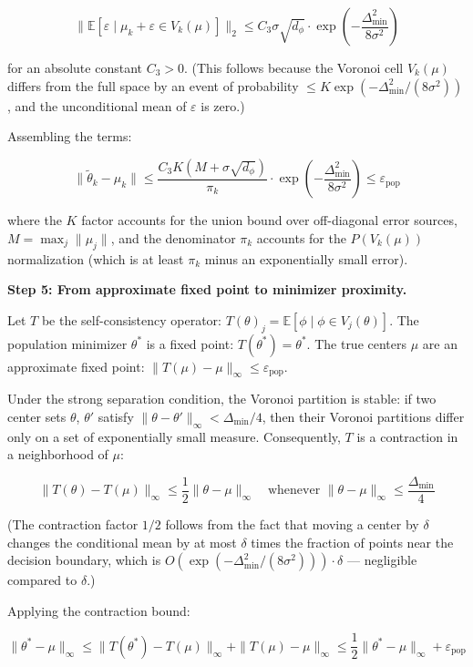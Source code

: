 \documentclass[
  12pt,
]{article}
\begin{document}
\[\|\mathbb{E}[\varepsilon \mid \mu_k + \varepsilon \in V_k(\mu)]\|_2 \leq C_3 \sigma \sqrt{d_\phi} \cdot \exp\left(-\frac{\Delta_{\min}^2}{8\sigma^2}\right)\]

for an absolute constant \(C_3 > 0\). (This follows because the Voronoi
cell \(V_k(\mu)\) differs from the full space by an event of probability
\(\leq K \exp(-\Delta_{\min}^2/(8\sigma^2))\), and the unconditional
mean of \(\varepsilon\) is zero.)

Assembling the terms:

\[\|\tilde{\theta}_k - \mu_k\| \leq \frac{C_3 K (M + \sigma\sqrt{d_\phi})}{\pi_k} \cdot \exp\left(-\frac{\Delta_{\min}^2}{8\sigma^2}\right) \leq \varepsilon_{\text{pop}}\]

where the \(K\) factor accounts for the union bound over off-diagonal
error sources, \(M = \max_j \|\mu_j\|\), and the denominator \(\pi_k\)
accounts for the \(P(V_k(\mu))\) normalization (which is at least
\(\pi_k\) minus an exponentially small error).

\textbf{Step 5: From approximate fixed point to minimizer proximity.}

Let \(T\) be the self-consistency operator:
\(T(\theta)_j = \mathbb{E}[\phi \mid \phi \in V_j(\theta)]\). The
population minimizer \(\theta^*\) is a fixed point:
\(T(\theta^*) = \theta^*\). The true centers \(\mu\) are an approximate
fixed point: \(\|T(\mu) - \mu\|_\infty \leq \varepsilon_{\text{pop}}\).

Under the strong separation condition, the Voronoi partition is stable:
if two center sets \(\theta\), \(\theta'\) satisfy
\(\|\theta - \theta'\|_\infty < \Delta_{\min}/4\), then their Voronoi
partitions differ only on a set of exponentially small measure.
Consequently, \(T\) is a contraction in a neighborhood of \(\mu\):

\[\|T(\theta) - T(\mu)\|_\infty \leq \frac{1}{2} \|\theta - \mu\|_\infty \quad \text{whenever } \|\theta - \mu\|_\infty \leq \frac{\Delta_{\min}}{4}\]

(The contraction factor \(1/2\) follows from the fact that moving a
center by \(\delta\) changes the conditional mean by at most \(\delta\)
times the fraction of points near the decision boundary, which is
\(O(\exp(-\Delta_{\min}^2/(8\sigma^2))) \cdot \delta\) --- negligible
compared to \(\delta\).)

Applying the contraction bound:

\[\|\theta^* - \mu\|_\infty \leq \|T(\theta^*) - T(\mu)\|_\infty + \|T(\mu) - \mu\|_\infty \leq \frac{1}{2} \|\theta^* - \mu\|_\infty + \varepsilon_{\text{pop}}\]
\end{document}
